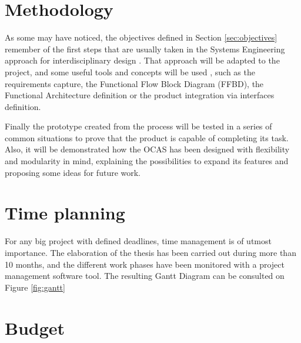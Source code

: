 \section{Methodology}

As some may have noticed, the objectives defined in Section \ref{sec:objectives} remember of the first steps that are usually taken in the Systems Engineering approach for interdisciplinary design \cite{whatissystemsengineering}.
That approach will be adapted to the project, and some useful tools and concepts will be used \cite{nationalaeronauticsandspaceadministration2007}, such as the requirements capture, the Functional Flow Block Diagram (FFBD), the Functional Architecture definition or the product integration via interfaces definition.

Finally the prototype created from the process will be tested in a series of common situations to prove that the product is capable of completing its task.
Also, it will be demonstrated how the OCAS has been designed with flexibility and modularity in mind, explaining the possibilities to expand its features and proposing some ideas for future work.

\section{Time planning}

For any big project with defined deadlines, time management is of utmost importance.
The elaboration of the thesis has been carried out during more than 10 months, and the different work phases have been monitored with a project management software tool.
The resulting Gantt Diagram can be consulted on Figure \ref{fig:gantt}



\section{Budget}



